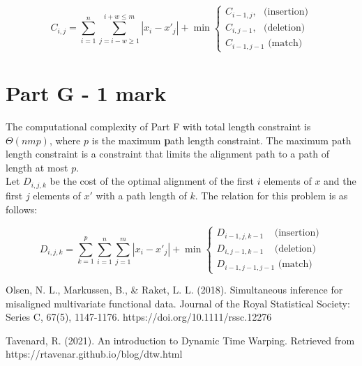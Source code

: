 \documentclass[12pt]{article}
\begin{document}
$$
C_{i, j} = \sum_{i = 1}^{n}{\sum_{j = i - w \geq 1}^{i + w \leq m}{|x_i - x'_j| + \min \begin{cases}
C_{i - 1, j}, \, \, \text{   (insertion)}\\
C_{i, j-1}, \, \, \text{   (deletion)}\\
C_{i-1, j-1} \text{  (match)}
\end{cases}}} 
$$

\section{Part G - 1 mark}
The computational complexity of Part F with total length constraint is $\Theta(nmp)$, where $p$ is the maximum \textbf{p}ath length constraint. The maximum path length constraint is a constraint that limits the alignment path to a path of length at most $p$. \\

Let $D_{i, j, k}$ be the cost of the optimal alignment of the first $i$ elements of $x$ and the first $j$ elements of $x'$ with a path length of $k$. The relation for this problem is as follows:

$$
D_{i, j, k} = \sum_{k = 1}^{p}{\sum_{i = 1}^{n}{\sum_{j = 1}^{m}{|x_i - x'_j| + \min \begin{cases}
D_{i-1, j, k-1} \, \, \; \, \text{   (insertion)}\\
D_{i, j-1, k-1} \, \, \; \, \text{   (deletion)}\\
D_{i-1, j-1, j-1} \text{  (match)}
\end{cases}}}} 
$$


\begin{thebibliography}{9}
Olsen, N. L., Markussen, B., \& Raket, L. L. (2018). Simultaneous inference for misaligned multivariate functional data. Journal of the Royal Statistical Society: Series C, 67(5), 1147-1176. https://doi.org/10.1111/rssc.12276

Tavenard, R. (2021). An introduction to Dynamic Time Warping. Retrieved from https://rtavenar.github.io/blog/dtw.html
\end{thebibliography}
\end{document}
